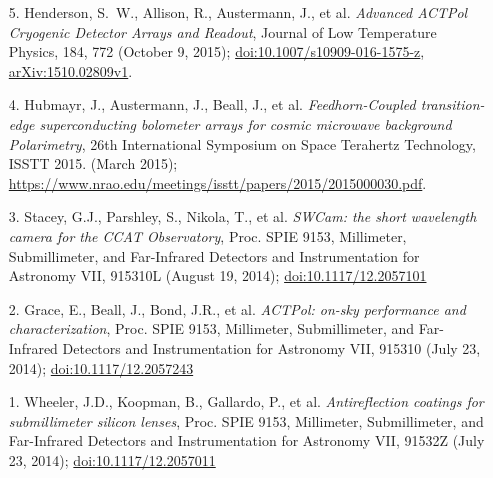 \documentclass[margin,line]{res}
\begin{document}
\begin{resume}
\begin{enumerate}
\item[{5.}] Henderson, S.~W., Allison, R., Austermann, J., et al.
    \textit{Advanced ACTPol Cryogenic Detector Arrays and Readout}, Journal of Low
    Temperature Physics, 184, 772 (October 9, 2015);
    \href{http://dx.doi.org/10.1007/s10909-016-1575-z}{doi:10.1007/s10909-016-1575-z},
    \href{http://arxiv.org/abs/1510.02809v1}{arXiv:1510.02809v1}.
\item[{4.}] Hubmayr, J., Austermann, J., Beall, J., et al. \textit{Feedhorn-Coupled
    transition-edge superconducting bolometer arrays for cosmic microwave
    background Polarimetry}, 26th International Symposium on Space Terahertz
    Technology, ISSTT 2015. (March 2015);\\
    \href{https://www.nrao.edu/meetings/isstt/papers/2015/2015000030.pdf}{https://www.nrao.edu/meetings/isstt/papers/2015/2015000030.pdf}.
\item[{3.}] Stacey, G.J., Parshley, S., Nikola, T., et al.
    \textit{SWCam: the short wavelength camera for the CCAT Observatory},
    Proc. SPIE 9153, Millimeter, Submillimeter, and Far-Infrared Detectors and Instrumentation for Astronomy VII, 
    915310L (August 19, 2014); \href{http://dx.doi.org/10.1117/12.2057101}{doi:10.1117/12.2057101}
\item[{2.}] Grace, E., Beall, J., Bond, J.R., et al.
    \textit{ACTPol: on-sky performance and characterization},
    Proc. SPIE 9153, Millimeter, Submillimeter, and Far-Infrared Detectors and Instrumentation for Astronomy VII, 
    915310 (July 23, 2014); \href{http://dx.doi.org/10.1117/12.2057243}{doi:10.1117/12.2057243}
\item[{1.}] Wheeler, J.D., Koopman, B., Gallardo, P., et al.
    \textit{Antireflection coatings for submillimeter silicon lenses},
    Proc. SPIE 9153, Millimeter, Submillimeter, and Far-Infrared Detectors and Instrumentation for Astronomy VII, 
    91532Z (July 23, 2014); \href{http://dx.doi.org/10.1117/12.2057011}{doi:10.1117/12.2057011}
\end{enumerate}


\end{resume}
\end{document}
